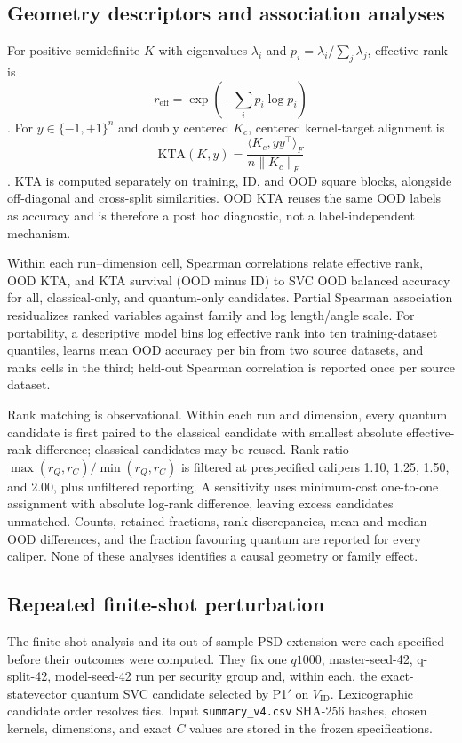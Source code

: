 \documentclass[referee,lineno,pdflatex,sn-vancouver-num]{sn-jnl}
\theoremstyle{thmstyleone}%
\theoremstyle{thmstyletwo}%
\theoremstyle{thmstylethree}%
\begin{document}
\subsection{Geometry descriptors and association analyses}

For positive-semidefinite $K$ with eigenvalues $\lambda_i$ and $p_i=\lambda_i/\sum_j\lambda_j$, effective rank is
\[
r_{\mathrm{eff}}=\exp\!\left(-\sum_i p_i\log p_i\right)
\]
\cite{roy2007effective}. For $y\in\{-1,+1\}^n$ and doubly centered $K_c$, centered kernel-target alignment is
\[
\mathrm{KTA}(K,y)=
\frac{\langle K_c,yy^\top\rangle_F}{n\|K_c\|_F}
\]
\cite{cristianini2001kta,cortes2012centeredalignment}. KTA is computed separately on training, ID, and OOD square blocks, alongside off-diagonal and cross-split similarities. OOD KTA reuses the same OOD labels as accuracy and is therefore a post hoc diagnostic, not a label-independent mechanism.

Within each run--dimension cell, Spearman correlations relate effective rank, OOD KTA, and KTA survival (OOD minus ID) to SVC OOD balanced accuracy for all, classical-only, and quantum-only candidates. Partial Spearman association residualizes ranked variables against family and log length/angle scale. For portability, a descriptive model bins log effective rank into ten training-dataset quantiles, learns mean OOD accuracy per bin from two source datasets, and ranks cells in the third; held-out Spearman correlation is reported once per source dataset.

Rank matching is observational. Within each run and dimension, every quantum candidate is first paired to the classical candidate with smallest absolute effective-rank difference; classical candidates may be reused. Rank ratio $\max(r_Q,r_C)/\min(r_Q,r_C)$ is filtered at prespecified calipers 1.10, 1.25, 1.50, and 2.00, plus unfiltered reporting. A sensitivity uses minimum-cost one-to-one assignment with absolute log-rank difference, leaving excess candidates unmatched. Counts, retained fractions, rank discrepancies, mean and median OOD differences, and the fraction favouring quantum are reported for every caliper. None of these analyses identifies a causal geometry or family effect.

\subsection{Repeated finite-shot perturbation}

The finite-shot analysis and its out-of-sample PSD extension were each specified before their outcomes were computed. They fix one $q1000$, master-seed-42, q-split-42, model-seed-42 run per security group and, within each, the exact-statevector quantum SVC candidate selected by P1$'$ on $V_{\mathrm{ID}}$. Lexicographic candidate order resolves ties. Input \texttt{summary\_v4.csv} SHA-256 hashes, chosen kernels, dimensions, and exact $C$ values are stored in the frozen specifications.
\end{document}

